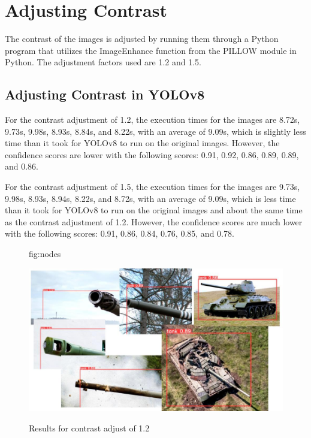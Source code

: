 \documentclass[pmlr,twocolumn,10pt]{jmlr} %
\begin{document}
\section{Adjusting Contrast}
The contrast of the images is adjusted by running them through a Python program that utilizes the ImageEnhance function from the PILLOW module in Python. The adjustment factors used are 1.2 and 1.5.

\subsection{Adjusting Contrast in YOLOv8}
\label{sec:figures}

For the contrast adjustment of 1.2, the execution times for the images are 8.72s, 9.73s, 9.98s, 8.93s, 8.84s, and 8.22s, with an average of 9.09s, which is slightly less time than it took for YOLOv8 to run on the original images. However, the confidence scores are lower with the following scores: 0.91, 0.92, 0.86, 0.89, 0.89, and 0.86.

For the contrast adjustment of 1.5, the execution times for the images are 9.73s, 9.98s, 8.93s, 8.94s, 8.22s, and 8.72s, with an average of 9.09s, which is less time than it took for YOLOv8 to run on the original images and about the same time as the contrast adjustment of 1.2. However, the confidence scores are much lower with the following scores: 0.91, 0.86, 0.84, 0.76, 0.85, and 0.78.

\begin{figure}[htbp]
\floatconts
  {fig:nodes}
  {\caption{Results for contrast adjust of 1.2}}
  {\includegraphics[width=1\linewidth]{images/Yolo8Con12.jpg}}
\end{figure}
\end{document}
